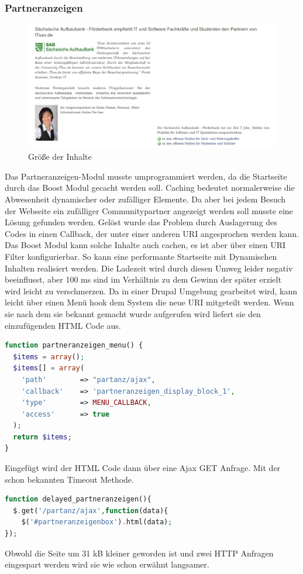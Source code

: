 \subsubsection{Partneranzeigen}
\begin{figure}[htbp]
  \centering
  \includegraphics[width=1.1\textwidth]{material/partneranzeigen.png}
  \caption{Größe der Inhalte}
  \label{fig:startbyte}
\end{figure}
Das Partneranzeigen-Modul musste umprogrammiert werden, da die Startseite durch das Boost Modul gecacht werden soll. Caching bedeutet normalerweise die Abwesenheit dynamischer oder zufälliger Elemente. Da aber bei jedem Besuch der Webseite ein zufälliger Communitypartner angezeigt werden soll musste eine Lösung gefunden werden. Gelöst wurde das Problem durch Auslagerung des Codes in einen Callback, der unter einer anderen URI angesprochen werden kann. Das Boost Modul kann solche Inhalte auch cachen, es ist aber über einen URI Filter konfigurierbar. So kann eine performante Startseite mit Dynamischen Inhalten realisiert werden. Die Ladezeit wird durch diesen Umweg leider negativ beeinflusst, aber 100 ms sind im Verhältnis zu dem Gewinn der später erzielt wird leicht zu verschmerzen. Da in einer Drupal Umgebung gearbeitet wird, kann leicht über einen Menü hook dem System die neue URI mitgeteilt werden. Wenn sie nach dem sie bekannt gemacht wurde aufgerufen wird liefert sie den einzufügenden HTML Code aus.
\begin{lstlisting}[language=php,label=Ajax - hook,caption=Ajax - hook]
function partneranzeigen_menu() {
  $items = array();
  $items[] = array(
    'path'        => "partanz/ajax",
    'callback'    => 'partneranzeigen_display_block_1',
    'type'        => MENU_CALLBACK,
    'access'      => true
  );
  return $items;
}
\end{lstlisting}
Eingefügt wird der HTML Code dann über eine Ajax GET Anfrage. Mit der schon bekannten Timeout Methode.
\begin{lstlisting}[language=php,label=Ajax - GET,caption=Ajax - GET]
function delayed_partneranzeigen(){
  $.get('/partanz/ajax',function(data){
    $('#partneranzeigenbox').html(data);
});
\end{lstlisting}
Obwohl die Seite um 31 kB kleiner geworden ist und zwei HTTP Anfragen eingespart werden wird sie wie schon erwähnt langsamer.


